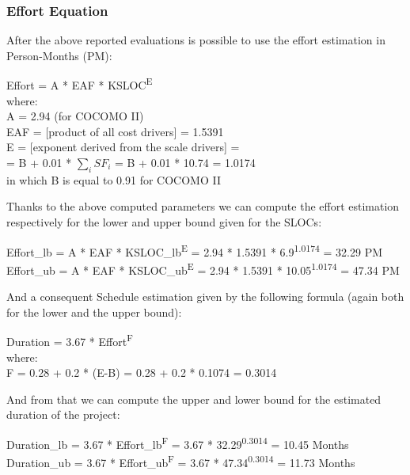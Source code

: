 \documentclass[a4paper,10pt]{article}
\begin{document}
  \subsubsection{Effort Equation}
  After the above reported evaluations is possible to use the effort estimation in Person-Months (PM):
  \begin{center}
    Effort = A * EAF * KSLOC\textsuperscript{E}\\\bigskip
    where:\\\bigskip
    A = 2.94 (for COCOMO II)\\\bigskip
    EAF = [product of all cost drivers] = 1.5391 \\\bigskip
    E = [exponent derived from the scale drivers] =\\
    = B + 0.01 * $\sum_{i}{SF_i}$ = B + 0.01 * 10.74 = 1.0174\\\bigskip
    in which B is equal to 0.91 for COCOMO II
  \end{center}
  Thanks to the above computed parameters we can compute the effort estimation respectively for
  the lower and upper bound given for the SLOCs:
    \begin{center}
    Effort_{lb} = A * EAF * KSLOC_{lb}\textsuperscript{E} = 2.94 * 1.5391 * 6.9\textsuperscript{1.0174} = 32.29 PM\\\bigskip
    Effort_{ub} = A * EAF * KSLOC_{ub}\textsuperscript{E} = 2.94 * 1.5391 * 10.05\textsuperscript{1.0174} = 47.34 PM
    \\\bigskip
  \end{center}
  And a consequent Schedule estimation given by the following formula (again both for the lower and the upper bound):
  \begin{center}
    Duration = 3.67 * Effort\textsuperscript{F}\\\bigskip
    where:\\\bigskip
    F = 0.28 + 0.2 * (E-B) = 0.28 + 0.2 * 0.1074 = 0.3014
    \\\bigskip
  \end{center}
  And from that we can compute the upper and lower bound for the estimated duration of the project:
  \begin{center}
    Duration_{lb} = 3.67 * Effort_{lb}\textsuperscript{F} = 3.67 * 32.29\textsuperscript{0.3014} = 10.45 Months\\\bigskip
    Duration_{ub} = 3.67 * Effort_{ub}\textsuperscript{F} = 3.67 * 47.34\textsuperscript{0.3014} = 11.73 Months\\\bigskip

  \end{center}
\end{document}
